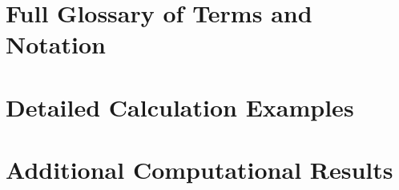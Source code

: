 \documentclass[12pt,a4paper]{article}
\theoremstyle{definition}
\begin{document}



\appendix

\section{Full Glossary of Terms and Notation}
\label{app:glossary}


\section{Detailed Calculation Examples}
\label{app:examples}


\section{Additional Computational Results}
\label{app:experiments}

\end{document}
